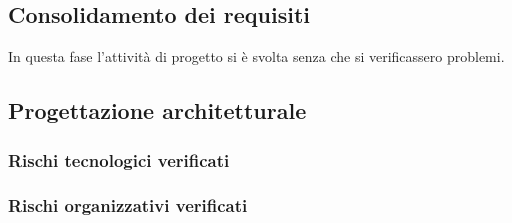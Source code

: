 \subsection{Consolidamento dei requisiti}
In questa fase l'attività di progetto si è svolta senza che si verificassero problemi.

\subsection{Progettazione architetturale}

\subsubsection{Rischi tecnologici verificati}
\def\problems{
    {   
        RT1,
        Technology Baseline,
        Nessun membro del gruppo è pratico o ha conoscenze approfondite delle tecnologie coinvolte per la realizzazione del POC.,
        È stato dedicato un periodo di 2 settimane all'autoapprendimento delle tecnologie coinvolte{,} in particolare è stato deciso che ogni membro del gruppo deve avere per ognuna una conoscenza almeno superficiale.
    },
}

\subsubsection{Rischi organizzativi verificati}
\def\problems{
    {
        RO1,
        Technology Baseline,
        Causato dal rischio RT1{,} Technology Baseline{,} i programmatori hanno avuto bisogno di più tempo di quanto preventivato per utilizzare efficacemente le tecnologie richieste per la realizzazione del POC.,
        È stato tolto del tempo alla progettazione per concentrarsi maggiormente alla programmazione.
    },
    {
        RO2,
        Sessione invernale,
        La sessione invernale è stata particolarmente impegnativa per la maggior parte del gruppo.,
        È stata utilizzata la revisione a modalità \noexpand\textit{Sportello}: il team ha deciso di ritardare la consegna della Technology Baseline{,} nonché la consegna dei documenti per la RP rispettivamente al 2021-03-09 e al 2021-03-10.
    },
}
